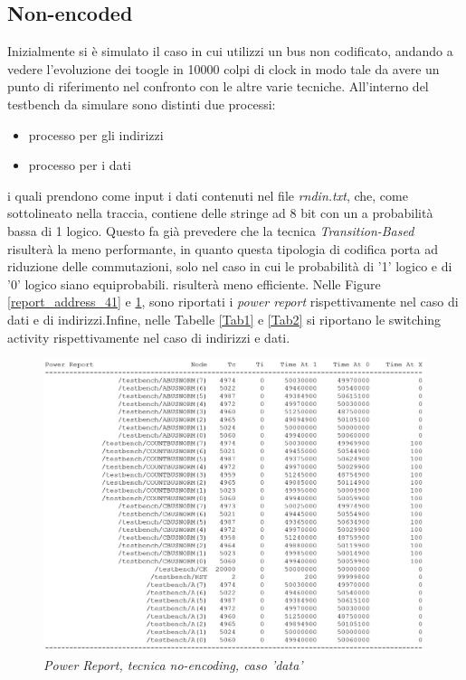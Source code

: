 \subsection{Non-encoded}
Inizialmente si è simulato il caso in cui utilizzi un bus non codificato, andando a vedere l'evoluzione dei toogle in 10000 colpi di clock in modo tale da avere un punto di riferimento nel confronto con le altre varie tecniche. All'interno del testbench da simulare sono distinti due processi:
\begin{itemize}
	\item processo per gli indirizzi
	\item processo per i dati
\end{itemize}
i quali prendono come input i dati contenuti nel file \textit{rndin.txt}, che, come sottolineato nella traccia, contiene delle stringe ad 8 bit con un a probabilità bassa di 1 logico. Questo fa già prevedere che la tecnica \textit{Transition-Based} risulterà la meno performante, in quanto questa tipologia di codifica porta ad riduzione delle commutazioni, solo nel caso in cui le probabilità di '1' logico e di '0' logico siano equiprobabili.
risulterà meno efficiente. Nelle Figure \ref{report_address_41} e \ref{report_dati_41}, sono riportati i \textit{power report} rispettivamente nel caso di dati e di indirizzi.Infine, nelle Tabelle \ref{Tab1} e \ref{Tab2} si riportano le switching activity rispettivamente nel caso di indirizzi e dati.
\begin{figure}[!htb]
	\centering
	\includegraphics[scale=0.65]{immagini/4_1_data_report}
	\caption{\textit{Power Report, tecnica no-encoding, caso 'data'}}
	\label{report_dati_41}
\end{figure}
